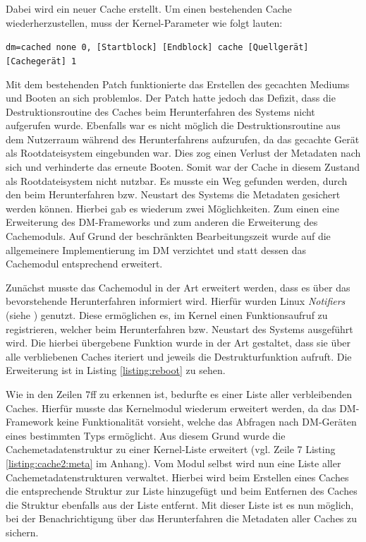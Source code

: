 Dabei wird ein neuer Cache erstellt. Um einen bestehenden Cache wiederherzustellen, muss der Kernel-Parameter wie folgt lauten:

\begin{flushleft}
\hspace{0.25cm} \small \texttt{dm=\dq cached none 0, [Startblock] [Endblock] cache [Quellgerät] [Cachegerät] 1\dq}
\end{flushleft}

Mit dem bestehenden Patch funktionierte das Erstellen des gecachten Mediums und Booten an sich problemlos. Der Patch hatte jedoch das Defizit, dass die
Destruktionsroutine des Caches beim Herunterfahren des Systems nicht aufgerufen wurde. Ebenfalls war es nicht möglich die Destruktionsroutine aus dem Nutzerraum
während des Herunterfahrens aufzurufen, da das gecachte Gerät als Rootdateisystem eingebunden war. Dies zog einen Verlust der Metadaten nach sich und verhinderte
das erneute Booten. Somit war der Cache in diesem Zustand als Rootdateisystem nicht nutzbar. Es musste ein Weg gefunden werden, durch den beim Herunterfahren
bzw. Neustart des Systems die Metadaten gesichert werden können. Hierbei gab es wiederum zwei Möglichkeiten. Zum einen eine Erweiterung des \ac{DM}-Frameworks
und zum anderen die Erweiterung des Cachemoduls. Auf Grund der beschränkten Bearbeitungszeit wurde auf die allgemeinere Implementierung im \ac{DM} verzichtet
und statt dessen das Cachemodul entsprechend erweitert.

Zunächst musste das Cachemodul in der Art erweitert werden, dass es über das bevorstehende Herunterfahren informiert wird. Hierfür wurden Linux
\textit{Notifiers} (siehe \cite{notifiers}) genutzt. Diese ermöglichen es, im Kernel einen Funktionsaufruf zu registrieren, welcher beim Herunterfahren bzw.
Neustart des Systems ausgeführt wird. Die hierbei übergebene Funktion wurde in der Art gestaltet, dass sie über alle verbliebenen Caches iteriert und
jeweils die Destrukturfunktion aufruft. Die Erweiterung ist in Listing \ref{listing:reboot} zu sehen.

Wie in den Zeilen 7ff zu erkennen ist, bedurfte es einer Liste aller verbleibenden Caches. Hierfür musste das Kernelmodul wiederum erweitert werden, da das
\ac{DM}-Framework keine Funktionalität vorsieht, welche das Abfragen nach \ac{DM}-Geräten eines bestimmten Typs ermöglicht. Aus diesem Grund wurde die
Cachemetadatenstruktur zu einer Kernel-Liste erweitert (vgl. Zeile 7 Listing \ref{listing:cache2:meta} im Anhang). Vom Modul selbst wird nun eine Liste aller
Cachemetadatenstrukturen verwaltet. Hierbei wird beim Erstellen eines Caches die entsprechende Struktur zur Liste hinzugefügt und beim Entfernen des Caches die
Struktur ebenfalls aus der Liste entfernt. Mit dieser Liste ist es nun möglich, bei der Benachrichtigung über das Herunterfahren die Metadaten aller Caches zu
sichern.

